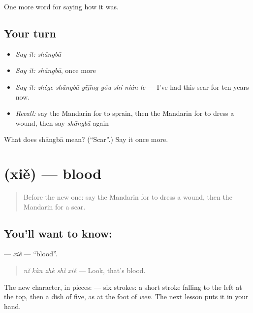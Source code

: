 \begin{grammarlens}[title={What you've built}]
One more word for saying how it was.
\end{grammarlens}

\subsection*{Your turn}
\begin{itemize}
\raggedright
  \item \emph{Say it:} \emph{shāngbā}
  \item \emph{Say it:} \emph{shāngbā}, once more
  \item \emph{Say it:} \emph{zhège shāngbā yǐjīng yǒu shí nián le} — I've had this scar for ten years now.
  \item \emph{Recall:} say the Mandarin for to sprain, then the Mandarin for to dress a wound, then say \emph{shāngbā} again
\end{itemize}

\begin{tcolorbox}[breakable,colback=teal!4,colframe=teal!35!black,title={Before you move on}]
What does shāngbā mean? (\textquotedblleft{}Scar\textquotedblright{}.) Say it once more.
\end{tcolorbox}
\section[\texorpdfstring{\zh{血} (xiě)}{血 (xiě)}]{ (xiě) — blood}

\label{lesson:ZH-C479-xie}



\begin{quote}
Before the new one: say the Mandarin for to dress a wound, then the Mandarin for a scar.
\end{quote}

\subsection*{You'll want to know: }
\textbf{} — \emph{xiě} — \textquotedblleft{}blood\textquotedblright{}.

\begin{quote}
\textbf{} \emph{nǐ kàn zhè shì xiě} — Look, that's blood.
\end{quote}

The new character, in pieces:  — six strokes: a short stroke falling to the left at the top, then a dish of five, as at the foot of  \emph{wēn}. The next lesson puts it in your hand.

